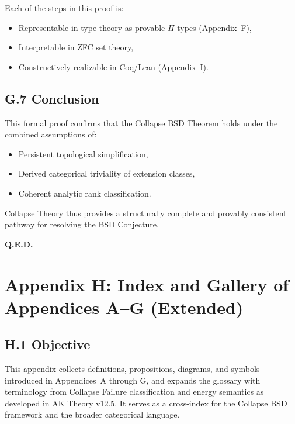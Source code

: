 \documentclass[11pt]{article}
\begin{document}
Each of the steps in this proof is:
\begin{itemize}
  \item Representable in type theory as provable $\Pi$-types (Appendix~F),
  \item Interpretable in ZFC set theory,
  \item Constructively realizable in Coq/Lean (Appendix~I).
\end{itemize}

\subsection*{G.7 Conclusion}

This formal proof confirms that the Collapse BSD Theorem holds under the combined assumptions of:
\begin{itemize}
  \item Persistent topological simplification,
  \item Derived categorical triviality of extension classes,
  \item Coherent analytic rank classification.
\end{itemize}

Collapse Theory thus provides a structurally complete and provably consistent pathway for resolving the BSD Conjecture.

\begin{flushright}
\textbf{Q.E.D.}
\end{flushright}




\section*{Appendix H: Index and Gallery of Appendices A--G (Extended)}

\subsection*{H.1 Objective}

This appendix collects definitions, propositions, diagrams, and symbols introduced in Appendices~A through G, and expands the glossary with terminology from Collapse Failure classification and energy semantics as developed in AK Theory v12.5. It serves as a cross-index for the Collapse BSD framework and the broader categorical language.
\end{document}
